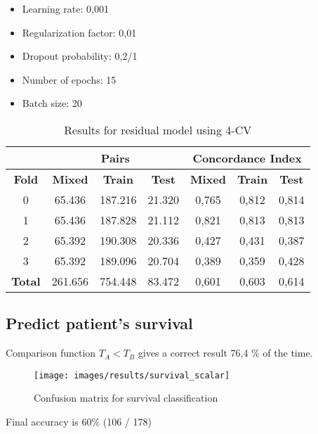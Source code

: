 \begin{frame}
  \begin{itemize}
    \item Learning rate: 0,001
    \item Regularization factor: 0,01
    \item Dropout probability: 0,2/1
    \item Number of epochs: 15
    \item Batch size: 20
  \end{itemize}

  \begin{table}
    \centering
    \begin{tabular}{|c||c|c|c||c|c|c|}
      \cline{2-7}
      \multicolumn{1}{c|}{} & \multicolumn{3}{|c||}{\textbf{Pairs}} & 
      \multicolumn{3}{c|}{\textbf{Concordance Index}} \\
      \hline
      \textbf{Fold} & \textbf{Mixed} & \textbf{Train} & \textbf{Test} & 
      \textbf{Mixed} & \textbf{Train} & \textbf{Test} \\
      \hhline{=======}
      0 & 65.436 & 187.216 & 21.320 & 0,765 & 0,812 & 0,814 \\
      1 & 65.436 & 187.828 & 21.112 & 0,821 & 0,813 & 0,813 \\
      2 & 65.392 & 190.308 & 20.336 & 0,427 & 0,431 & 0,387 \\
      3 & 65.392 & 189.096 & 20.704 & 0,389 & 0,359 & 0,428 \\
      \hhline{=======}
      \textbf{Total} & 261.656 & 754.448 & 83.472 & 0,601 & 0,603 & 0,614 \\
      \hline
    \end{tabular}
  
    \caption[Residual 4-CV results]{
      Results for residual model using 4-CV \label{tab:results-residual-4CV}
    }
  \end{table}
\end{frame}

\subsection{Predict patient's survival}

\begin{frame}{\insertsubsec}
  Comparison function \( T_A < T_B \) gives a correct result 76,4 \% of the time.
  \begin{figure}
    \centering
    \texttt{[image: images/results/survival\_scalar]}
  
    \caption{Confusion matrix for survival classification}
  \end{figure}

  Final accuracy is 60\% (106 / 178)
\end{frame}



